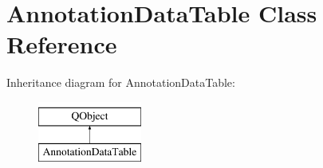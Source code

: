 \hypertarget{class_annotation_data_table}{}\section{Annotation\+Data\+Table Class Reference}
\label{class_annotation_data_table}
Inheritance diagram for Annotation\+Data\+Table\+:\begin{figure}[H]
\begin{center}
\leavevmode
\includegraphics[height=2.000000cm]{class_annotation_data_table}
\end{center}
\end{figure}
